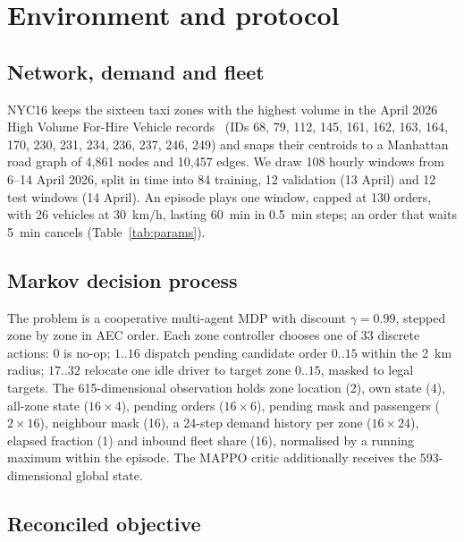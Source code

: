 \documentclass[3p,times,procedia]{elsarticle}
\begin{document}
\section{Environment and protocol}
\label{sec:env}

\subsection{Network, demand and fleet}
\label{sec:network}

NYC16 keeps the sixteen taxi zones with the highest volume in the April 2026 High Volume For-Hire Vehicle records~\cite{tlc2026} (IDs 68, 79, 112, 145, 161, 162, 163, 164, 170, 230, 231, 234, 236, 237, 246, 249) and snaps their centroids to a Manhattan road graph of 4{,}861 nodes and 10{,}457 edges. We draw 108 hourly windows from 6--14 April 2026, split in time into 84 training, 12 validation (13 April) and 12 test windows (14 April). An episode plays one window, capped at 130 orders, with 26 vehicles at 30~km/h, lasting 60~min in 0.5~min steps; an order that waits 5~min cancels (Table~\ref{tab:params}).

\subsection{Markov decision process}
\label{sec:mdp}

The problem is a cooperative multi-agent MDP with discount $\gamma=0.99$, stepped zone by zone in AEC order. Each zone controller chooses one of 33 discrete actions: $0$ is no-op; $1..16$ dispatch pending candidate order $0..15$ within the 2~km radius; $17..32$ relocate one idle driver to target zone $0..15$, masked to legal targets. The 615-dimensional observation holds zone location (2), own state (4), all-zone state ($16\times4$), pending orders ($16\times6$), pending mask and passengers ($2\times16$), neighbour mask (16), a 24-step demand history per zone ($16\times24$), elapsed fraction (1) and inbound fleet share (16), normalised by a running maximum within the episode. The MAPPO critic additionally receives the 593-dimensional global state.

\subsection{Reconciled objective}
\label{sec:objective}
\end{document}

